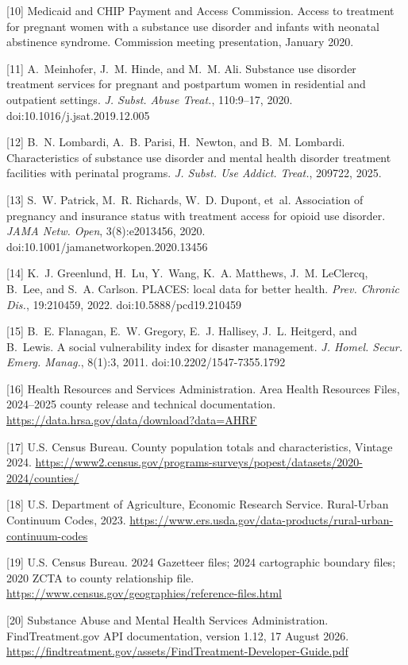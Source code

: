 \documentclass{article}
\begin{document}
[10] Medicaid and CHIP Payment and Access Commission. Access to treatment for pregnant women with a substance use disorder and infants with neonatal abstinence syndrome. Commission meeting presentation, January 2020.

[11] A.~Meinhofer, J.~M. Hinde, and M.~M. Ali. Substance use disorder treatment services for pregnant and postpartum women in residential and outpatient settings. \emph{J. Subst. Abuse Treat.}, 110:9--17, 2020. doi:10.1016/j.jsat.2019.12.005

[12] B.~N. Lombardi, A.~B. Parisi, H.~Newton, and B.~M. Lombardi. Characteristics of substance use disorder and mental health disorder treatment facilities with perinatal programs. \emph{J. Subst. Use Addict. Treat.}, 209722, 2025.

[13] S.~W. Patrick, M.~R. Richards, W.~D. Dupont, et~al. Association of pregnancy and insurance status with treatment access for opioid use disorder. \emph{JAMA Netw. Open}, 3(8):e2013456, 2020. doi:10.1001/jamanetworkopen.2020.13456

[14] K.~J. Greenlund, H.~Lu, Y.~Wang, K.~A. Matthews, J.~M. LeClercq, B.~Lee, and S.~A. Carlson. PLACES: local data for better health. \emph{Prev. Chronic Dis.}, 19:210459, 2022. doi:10.5888/pcd19.210459

[15] B.~E. Flanagan, E.~W. Gregory, E.~J. Hallisey, J.~L. Heitgerd, and B.~Lewis. A social vulnerability index for disaster management. \emph{J. Homel. Secur. Emerg. Manag.}, 8(1):3, 2011. doi:10.2202/1547-7355.1792

[16] Health Resources and Services Administration. Area Health Resources Files, 2024--2025 county release and technical documentation. \url{https://data.hrsa.gov/data/download?data=AHRF}

[17] U.S. Census Bureau. County population totals and characteristics, Vintage 2024. \url{https://www2.census.gov/programs-surveys/popest/datasets/2020-2024/counties/}

[18] U.S. Department of Agriculture, Economic Research Service. Rural-Urban Continuum Codes, 2023. \url{https://www.ers.usda.gov/data-products/rural-urban-continuum-codes}

[19] U.S. Census Bureau. 2024 Gazetteer files; 2024 cartographic boundary files; 2020 ZCTA to county relationship file. \url{https://www.census.gov/geographies/reference-files.html}

[20] Substance Abuse and Mental Health Services Administration. FindTreatment.gov API documentation, version 1.12, 17 August 2026. \url{https://findtreatment.gov/assets/FindTreatment-Developer-Guide.pdf}
\end{document}
